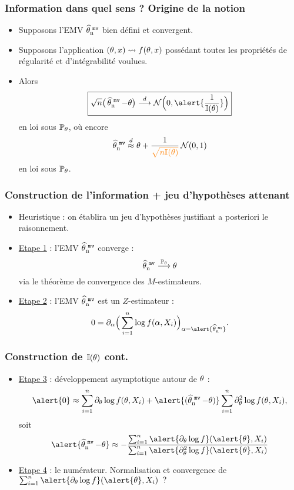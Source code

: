 \begin{frame}
\frametitle{Information dans quel sens ? Origine de la notion}
\begin{itemize}
\item Supposons l'EMV $\operatorname{\widehat \theta_n^{\,\,{\tt mv}}}$ bien défini et \alert{convergent}.
\item Supposons l'application $(\theta,x) \leadsto f(\theta, x)$ possédant \alert{toutes les propriétés de régularité et d'intégrabilité} voulues.
\item Alors
$$\boxed{\sqrt{n}\big(\estMV-\truetheta\big) \stackrel{d}{\longrightarrow} {\mathcal N}\Big(0,\alert{\frac{1}{\mathbb{I}(\truetheta)}}\Big)}$$
en loi sous $\operatorname{{\mathbb P}}_\theta$, où encore
$$\estMV \stackrel{d}{\approx} \truetheta +\frac{1}{\tco{\sqrt{n\mathbb{I}(\truetheta)}}} \,{\mathcal N}(0,1)$$
en loi sous $\operatorname{{\mathbb P}}_\theta$.
\end{itemize}
\end{frame}

\begin{frame}
\frametitle{Construction de l'information + jeu d'hypothèses attenant}
\begin{itemize}
\item Heuristique : on établira un jeu d'hypothèses justifiant \alert{a posteriori} le raisonnement.
\item \underline{Etape 1} : l'EMV $\operatorname{\widehat \theta_n^{\,\,{\tt mv}}}$ \alert{converge} :
$$\operatorname{\widehat \theta_n^{\,\,{\tt mv}}} \stackrel{\operatorname{{\mathbb P}}_\theta}{\longrightarrow} \theta$$
via le théorème de convergence des $M$-estimateurs.
\item \underline{Etape 2} : l'EMV $\operatorname{\widehat \theta_n^{\,\,{\tt mv}}}$ est un \alert{$Z$-estimateur} :
$$0 = \partial_\curtheta \Big(\sum_{i = 1}^n \log f(\curtheta,X_i)\Big)_{\curtheta = \alert{\estMV}}.$$
\end{itemize}
\end{frame}

\begin{frame}
\frametitle{Construction de $\mathbb{I}(\theta)$ cont.}
\begin{itemize}
\item \underline{Etape 3} : développement asymptotique \alert{autour de $\theta$} :
$$\alert{0}  \approx \sum_{i = 1}^n \partial_\truetheta \log f(\truetheta, X_i) + \alert{(\estMV-\truetheta)} \sum_{i = 1}^n \partial^2_\truetheta \log f(\truetheta, X_i),$$
soit
$$\alert{\estMV-\truetheta} \approx -\frac{\sum_{i = 1}^n \alert{\partial_\truetheta \log f}(\alert{\truetheta}, X_i)}{ \sum_{i = 1}^n \alert{\partial^2_\truetheta \log f}(\alert{\truetheta}, X_i)}$$
\item \underline{Etape 4} : le numérateur. Normalisation et convergence de
$\sum_{i = 1}^n \alert{\partial_\truetheta \log f}(\alert{\truetheta}, X_i)\;\;?$
\end{itemize}
\end{frame}

